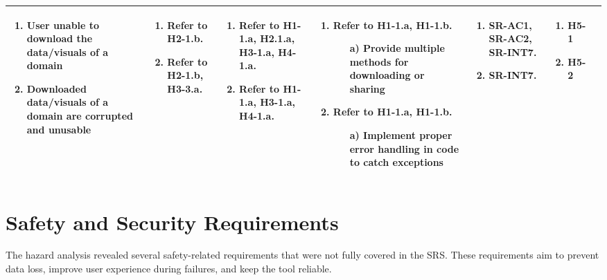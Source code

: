 \documentclass{article}
\begin{document}
\begin{landscape}
\begin{longtable}{|p{2cm}|p{4cm}|p{4cm}|p{4cm}|p{4cm}|p{2cm}|p{2cm}|}
  \begin{enumerate}[leftmargin=*]
    \item User unable to download the data/visuals of a domain
    \item Downloaded data/visuals of a domain are corrupted and unusable
  \end{enumerate} & 
  \begin{enumerate}[leftmargin=*]
      \item Refer to H2-1.b.
      \item Refer to H2-1.b, H3-3.a.
  \end{enumerate} &
  \begin{enumerate}[leftmargin=*]
    \item Refer to H1-1.a, H2.1.a, H3-1.a, H4-1.a.
    \item Refer to H1-1.a, H3-1.a, H4-1.a.
  \end{enumerate} &
  \begin{enumerate}[leftmargin=*]
       \item Refer to H1-1.a, H1-1.b.
       \begin{enumerate}
        \item[a)] Provide multiple methods for downloading or sharing
    \end{enumerate}
       \item Refer to H1-1.a, H1-1.b.
       \begin{enumerate}
        \item[a)] Implement proper error handling in code to catch exceptions
    \end{enumerate}
  \end{enumerate} &
  \begin{enumerate}[leftmargin=*]
       \item SR-AC1, SR-AC2, SR-INT7.
       \item SR-INT7.
  \end{enumerate} &
  \begin{enumerate}[leftmargin=*]
       \item H5-1
       \item H5-2
  \end{enumerate} \\
  \hline
  \end{longtable}
\end{landscape}
\restoregeometry


\section{Safety and Security Requirements}
The hazard analysis revealed several safety-related requirements that were not fully covered in the SRS.
These requirements aim to prevent data loss, improve user experience during failures, and keep the tool reliable.
\end{document}
